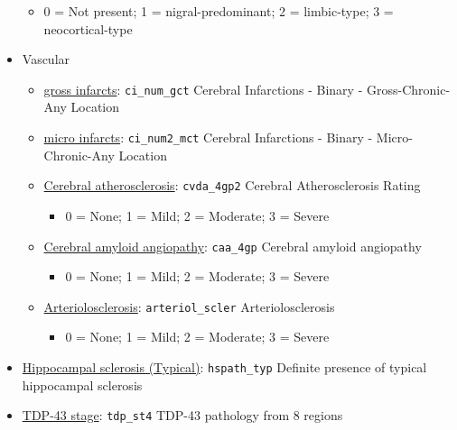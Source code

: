 \documentclass[]{book}
\providecommand{\tightlist}{%
  \setlength{\itemsep}{0pt}\setlength{\parskip}{0pt}}
\begin{document}
\begin{itemize}
  \begin{itemize}
  \tightlist
  \item
    0 = Not present; 1 = nigral-predominant; 2 = limbic-type; 3 = neocortical-type
  \end{itemize}
\item
  Vascular

  \begin{itemize}
  \tightlist
  \item
    \href{https://www.radc.rush.edu/docs/var/detail.htm?category=Pathology\&subcategory=Vascular+-+Infarcts+(Presence+of)\&variable=ci_num2_gct}{gross infarcts}: \texttt{ci\_num\_gct} Cerebral Infarctions - Binary - Gross-Chronic-Any Location
  \item
    \href{https://www.radc.rush.edu/docs/var/detail.htm?category=Pathology\&subcategory=Vascular+-+Infarcts+(Presence+of)\&variable=ci_num2_mct}{micro infarcts}: \texttt{ci\_num2\_mct} Cerebral Infarctions - Binary - Micro-Chronic-Any Location
  \item
    \href{https://www.radc.rush.edu/docs/var/detail.htm?category=Pathology\&subcategory=Vascular+-+General+measures\&variable=cvda_4gp2}{Cerebral atherosclerosis}: \texttt{cvda\_4gp2} Cerebral Atherosclerosis Rating

    \begin{itemize}
    \tightlist
    \item
      0 = None; 1 = Mild; 2 = Moderate; 3 = Severe
    \end{itemize}
  \item
    \href{https://www.radc.rush.edu/docs/var/detail.htm?category=Pathology\&subcategory=Vascular+-+General+measures\&variable=caa_4gp}{Cerebral amyloid angiopathy}: \texttt{caa\_4gp} Cerebral amyloid angiopathy

    \begin{itemize}
    \tightlist
    \item
      0 = None; 1 = Mild; 2 = Moderate; 3 = Severe
    \end{itemize}
  \item
    \href{https://www.radc.rush.edu/docs/var/detail.htm?category=Pathology\&subcategory=Vascular+-+General+measures\&variable=arteriol_scler}{Arteriolosclerosis}: \texttt{arteriol\_scler} Arteriolosclerosis

    \begin{itemize}
    \tightlist
    \item
      0 = None; 1 = Mild; 2 = Moderate; 3 = Severe
    \end{itemize}
  \end{itemize}
\item
  \href{https://www.radc.rush.edu/docs/var/detail.htm?category=Pathology\&subcategory=Hippocampal+sclerosis\&variable=hspath_typ}{Hippocampal sclerosis (Typical)}: \texttt{hspath\_typ} Definite presence of typical hippocampal sclerosis
\item
  \href{https://www.radc.rush.edu/docs/var/detail.htm?category=Pathology\&subcategory=TDP-43\&variable=tdp_st4}{TDP-43 stage}: \texttt{tdp\_st4} TDP-43 pathology from 8 regions


\end{itemize}
\end{document}
